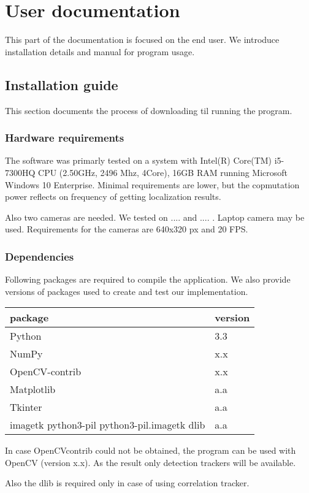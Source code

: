 \chapter{User documentation}
This part of the documentation is focused on the end user. We introduce
installation details and manual for program usage.

\section{Installation guide}
This section documents the process of downloading til running the program.

\subsection{Hardware requirements}
The software was primarly tested on a system with Intel(R) Core(TM) i5-7300HQ
CPU (2.50GHz, 2496 Mhz, 4Core), 16GB RAM running Microsoft Windows 10
Enterprise. Minimal requirements are lower, but the copmutation power reflects
on frequency of getting localization results.

Also two cameras are needed. We tested on .... and .... . Laptop camera may be
used. Requirements for the cameras are 640x320 px and 20 FPS.

\subsection{Dependencies}
Following packages are required to compile the application. We also provide
versions of packages used to create and test our implementation.

\begin{center}
\begin{tabular}{l l}
	package	&	version \\ \hline
	Python	&	3.3 \\
	NumPy	&	x.x \\
	OpenCV-contrib	&	x.x \\ 
	Matplotlib &	a.a \\
	Tkinter	&	a.a \\
	imagetk
	 python3-pil python3-pil.imagetk
	dlib	&	a.a
\end{tabular}
\end{center}

In case OpenCVcontrib could not be obtained, the program can be used with
OpenCV (version x.x). As the result only detection trackers will be available.

Also the dlib is required only in case of using correlation tracker.

